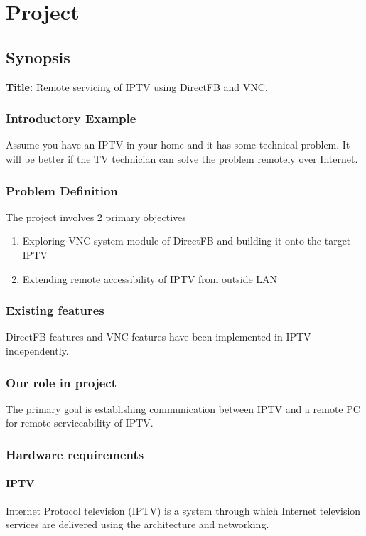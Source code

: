 \chapter{Project}
\section{Synopsis}
\textbf{Title:} Remote servicing of IPTV using DirectFB and VNC.

\subsection{Introductory Example}
Assume you have an IPTV in your home and it has some technical problem. It will be better if the TV technician can solve the problem remotely over Internet. 

\subsection{Problem Definition}
The project involves 2 primary objectives
\begin{enumerate}
\item Exploring VNC system module of DirectFB and building it onto the target IPTV
\item Extending remote accessibility of IPTV from outside LAN
\end{enumerate}

\subsection{Existing features}
DirectFB features and VNC features have been implemented in IPTV independently.

\subsection{Our role in project}
The primary goal is establishing communication between IPTV and a remote PC for remote serviceability of IPTV.


\subsection{Hardware requirements}

\subsubsection{IPTV}
	Internet Protocol television (IPTV) is a system through which Internet television services are delivered using the architecture and networking.\cite{IPTV}\\

